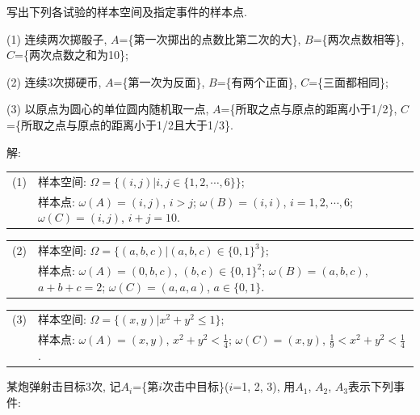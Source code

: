 \documentclass[standard]{ExBook}
\renewenvironment{shaded}{%
  \def\FrameCommand{\fboxsep=\FrameSep \colorbox{shadecolor}}%
  \MakeFramed{\advance\hsize-\width \FrameRestore}%
}{%
  \endMakeFramed
}
\begin{document}
\begin{qitems}
    \begin{bbox}
    \begin{shaded}
        \qitem 
写出下列各试验的样本空间及指定事件的样本点.

(1) 连续两次掷骰子, $A$=\{第一次掷出的点数比第二次的大\}, $B$=\{两次点数相等\}, $C$=\{两次点数之和为10\};

(2) 连续3次掷硬币, $A$=\{第一次为反面\}, $B$=\{有两个正面\}, $C$=\{三面都相同\};

(3) 以原点为圆心的单位圆内随机取一点, $A$=\{所取之点与原点的距离小于1/2\}, $C$=\{所取之点与原点的距离小于1/2且大于1/3\}.
    \end{shaded}
    \end{bbox}

\vspace{\dimexpr2.5cm-5em\relax}

解: 
\begin{flushleft}
\begin{tabular}{ll}
(1) &样本空间: $\Omega=\{(i,j)|i,j\in\{1,2,\cdots,6\}\}$;\\
 &样本点: $\omega(A)=(i,j)$, $i>j$; $\omega(B)=(i,i)$, $i=1,2,\cdots,6$; $\omega(C)=(i,j)$, $i+j=10$.
\end{tabular}
\end{flushleft}
\vspace{-1em}
\begin{flushleft}
\begin{tabular}{ll}
(2) &样本空间: $\Omega=\{(a,b,c)|(a,b,c)\in\{0,1\}^3\}$;\\
 &样本点: $\omega(A)=(0,b,c)$, $(b,c)\in\{0,1\}^2$; $\omega(B)=(a,b,c)$, $a+b+c=2$; $\omega(C)=(a,a,a)$, $a\in\{0,1\}$.
\end{tabular}
\end{flushleft}
\vspace{-1em}
\begin{flushleft}
\begin{tabular}{ll}
(3) &样本空间: $\Omega=\{(x,y)|x^2+y^2 \leq 1\}$;\\
 &样本点: $\omega(A)=(x,y)$, $x^2+y^2 < \frac{1}{4}$; $\omega(C)=(x,y)$, $\frac{1}{9} < x^2+y^2 < \frac{1}{4}$.
\end{tabular}
\end{flushleft}

    \begin{bbox}
    \begin{shaded}
        \qitem 
某炮弹射击目标3次, 记$A_{i}$=\{第$i$次击中目标\}($i$=1, 2, 3), 用$A_{1}$, $A_{2}$, $A_{3}$表示下列事件:


\end{shaded}
\end{bbox}
\end{qitems}
\end{document}
